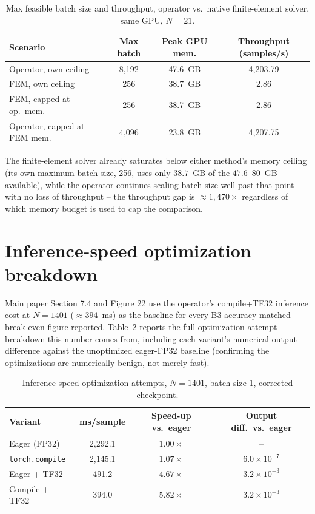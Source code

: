 \documentclass[11pt]{article}
\begin{document}
\begin{table}[h]
\centering
\caption{Max feasible batch size and throughput, operator vs.\ native
  finite-element solver, same GPU, $N{=}21$.}
\label{tab:s5}
\small
\begin{tabular}{lccc}
\toprule
Scenario & Max batch & Peak GPU mem. & Throughput (samples/s) \\
\midrule
Operator, own ceiling      & 8{,}192 & 47.6~GB & 4{,}203.79 \\
FEM, own ceiling           & 256     & 38.7~GB & 2.86 \\
FEM, capped at op.\ mem.\  & 256     & 38.7~GB & 2.86 \\
Operator, capped at FEM mem.\ & 4{,}096 & 23.8~GB & 4{,}207.75 \\
\bottomrule
\end{tabular}
\end{table}

The finite-element solver already saturates below either method's memory
ceiling (its own maximum batch size, 256, uses only $38.7$~GB of the
$47.6$--$80$~GB available), while the operator continues scaling batch
size well past that point with no loss of throughput -- the throughput
gap is $\approx1{,}470\times$ regardless of which memory budget is used
to cap the comparison.

\FloatBarrier
\section{Inference-speed optimization breakdown}
\label{sec:s6}
Main paper Section 7.4 and Figure 22 use the operator's compile+TF32
inference cost at $N{=}1401$ ($\approx394$~ms) as the baseline for every
B3 accuracy-matched break-even figure reported. Table~\ref{tab:s6} reports
the full optimization-attempt breakdown this number comes from, including
each variant's numerical output difference against the unoptimized
eager-FP32 baseline (confirming the optimizations are numerically benign,
not merely fast).

\begin{table}[h]
\centering
\caption{Inference-speed optimization attempts, $N{=}1401$, batch size 1,
  corrected checkpoint.}
\label{tab:s6}
\small
\begin{tabular}{lccc}
\toprule
Variant & ms/sample & Speed-up vs.\ eager & Output diff.\ vs.\ eager \\
\midrule
Eager (FP32)      & 2{,}292.1 & $1.00\times$ & -- \\
\texttt{torch.compile}        & 2{,}145.1 & $1.07\times$ & $6.0\times10^{-7}$ \\
Eager + TF32      & 491.2     & $4.67\times$ & $3.2\times10^{-3}$ \\
Compile + TF32    & 394.0     & $5.82\times$ & $3.2\times10^{-3}$ \\
\bottomrule
\end{tabular}
\end{table}
\end{document}
